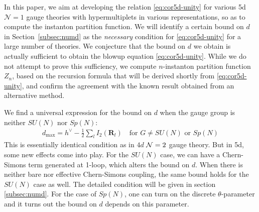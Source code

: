 \documentclass[letterpaper, 11pt]{article}
\def\CN{{\cal N}}
\begin{document}
In this paper, we aim at developing the relation \eqref{eq:cor5d-unity} for various 5d 
$\mathcal{N}=1$ gauge theories with hypermultiplets in various representations, so as to compute the instanton partition function. We will identify a certain bound on $d$ in Section~\ref{subsec:numd} as the \emph{necessary} condition for \eqref{eq:cor5d-unity} for a large number of theories. 
We conjecture that the bound on $d$ we obtain is actually sufficient to obtain the blowup equation \eqref{eq:cor5d-unity}. While we do not attempt to prove this sufficiency, we compute $n$-instanton partition function $Z_n$, based on the recursion formula that will be derived shortly from \eqref{eq:cor5d-unity}, and confirm the agreement with the known result obtained from an alternative method.

We find a universal expression for the bound on $d$ when the gauge group is neither $SU(N)$ nor $Sp(N)$:
\begin{align}
  \label{eq:cor5d-dmax}
 d_{\textrm{max}} =  h^\vee -\frac{1}{2}\sum_l I_2(\mathbf{R}_l) \quad \textrm{for } G \neq SU(N) \textrm{ or } Sp(N) 
\end{align}
This is essentially identical condition as in $4d$ $\CN=2$ gauge theory. But in 5d, some new effects come into play. 
For the $SU(N)$ case, we can have a Chern-Simons term generated at 1-loop, which alters the bound on $d$. When there is neither bare nor effective Chern-Simons coupling, the same bound holds for the $SU(N)$ case as well. The detailed condition will be given in section \ref{subsec:numd}. For the case of $Sp(N)$, one can turn on the discrete $\theta$-parameter and it turns out the bound on $d$ depends on this parameter. 
\end{document}
